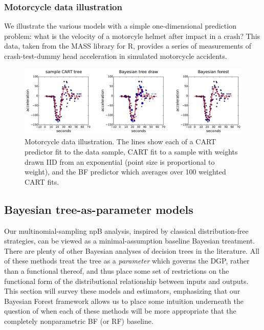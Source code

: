 \documentclass{article}
\begin{document}
\subsubsection{Motorcycle data
illustration}\label{motorcycle-data-illustration}

We illustrate the various models with a simple one-dimensional
prediction problem: what is the velocity of a motorcyle helmet after
impact in a crash? This data, taken from the MASS library for R,
provides a series of measurements of crash-test-dummy head acceleration
in simulated motorcycle accidents.

\begin{figure}
\includegraphics[width=\textwidth]{../graphs/mcycle}   
\caption{Motorcycle data illustration.  The lines show each of a CART predictor fit to the data sample, CART fit to a sample with weights drawn IID from an exponential (point size is proportional to weight), and the BF predictor which averages over 100 weighted CART fits.} 
\end{figure}    

    \subsection{Bayesian tree-as-parameter
models}\label{bayesian-tree-as-parameter-models}

Our multinomial-sampling npB analysis, inspired by classical
distribution-free strategies, can be viewed as a minimal-assumption
baseline Bayesian treatment. There are plenty of other Bayesian analyses
of decision trees in the literature. All of these methods treat the tree
as a \emph{parameter} which governs the DGP, rather than a functional
thereof, and thus place some set of restrictions on the functional form
of the distributional relationship between inputs and outputs. This
section will survey these models and estimators, emphasizing that our
Bayesian Forest framework allows us to place some intuition underneath
the question of when each of these methods will be more appropriate that
the completely nonparametric BF (or RF) baseline.
\end{document}
